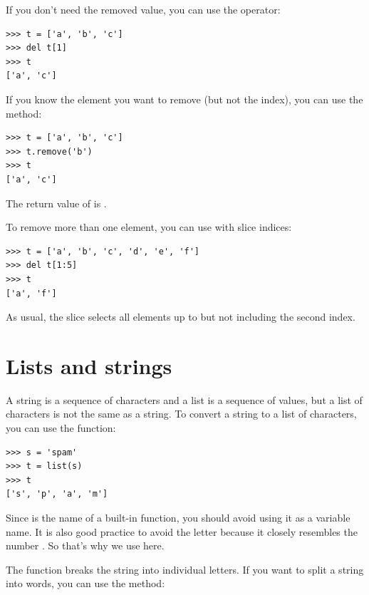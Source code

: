 If you don't need the removed value, you can use the  operator:

\begin{Verbatim}[frame=single]
>>> t = ['a', 'b', 'c']
>>> del t[1]
>>> t
['a', 'c']
\end{Verbatim}
%
If you know the element you want to remove (but not the index), you can use the  method:

\begin{Verbatim}[frame=single]
>>> t = ['a', 'b', 'c']
>>> t.remove('b')
>>> t
['a', 'c']
\end{Verbatim}
%
The return value of  is .

To remove more than one element, you can use  with slice indices:

\begin{Verbatim}[frame=single]
>>> t = ['a', 'b', 'c', 'd', 'e', 'f']
>>> del t[1:5]
>>> t
['a', 'f']
\end{Verbatim}
%
As usual, the slice selects all elements up to but not including the second index.


\section{Lists and strings}

A string is a sequence of characters and a list is a sequence of values, but a list of characters is not the same as a string. To convert a string to a list of characters, you can use the  function:

\begin{Verbatim}[frame=single]
>>> s = 'spam'
>>> t = list(s)
>>> t
['s', 'p', 'a', 'm']
\end{Verbatim}
%
Since  is the name of a built-in function, you should avoid using it as a variable name. It is also good practice to avoid the letter  because it closely resembles the number . So that's why we use  here.

The  function breaks the string into individual letters. If you want to split a string into words, you can use the  method:

